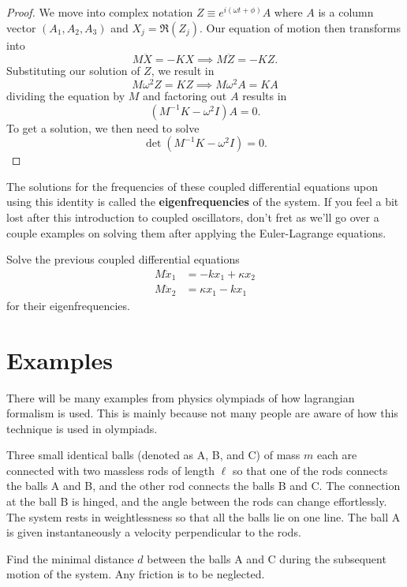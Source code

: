 \documentclass[11pt]{scrartcl}
\begin{document}
\begin{proof}
We move into complex notation $Z \equiv e^{i (\omega t + \phi)}A$ where $A$ is a column vector $(A_1, A_2, A_3)$ and $X_j = \Re (Z_j)$. Our equation of motion then transforms into 
\[M\ddot{X} = -KX\implies M\ddot{Z} = -KZ.\]
Substituting our solution of $Z$, we result in 
\[M\omega^2 Z = KZ \implies M\omega^2 A = KA\]
dividing the equation by $M$ and factoring out $A$ results in 
\[(M^{-1}K - \omega^2 I) A = 0.\]
To get a solution, we then need to solve 
\[\det (M^{-1} K - \omega^2 I) = 0.\]
\end{proof}
The solutions for the frequencies of these coupled differential equations upon using this identity is called the \textbf{eigenfrequencies} of the system. If you feel a bit lost after this introduction to coupled oscillators, don't fret as we'll go over a couple examples on solving them after applying the Euler-Lagrange equations. 
\begin{exercise}
Solve the previous coupled differential equations
\begin{align*}
    M\ddot{x}_1 &= -kx_1 + \kappa x_2 \\
    M\ddot{x}_2 &= \kappa x_1 - kx_1
\end{align*}
for their eigenfrequencies.
\end{exercise}
\newpage 
\section{Examples}
There will be many examples from physics olympiads of how lagrangian formalism is used. This is mainly because not many people are aware of how this technique is used in olympiads.
\begin{example}[2019 EuPhO]
Three small identical balls (denoted as A, B, and C) of mass $m$ each are connected with two massless rods of length $\ell$ so that one of the rods connects the balls A and B, and the other rod connects the balls B and C. The connection at the ball B is hinged, and the angle between the rods can change effortlessly. The system rests in weightlessness so that all the balls lie on one line. The ball A is given instantaneously a
velocity perpendicular to the rods. 

Find the minimal distance $d$ between the balls A and C during the subsequent motion of the system. Any friction is to be neglected.
\end{example}
\end{document}
